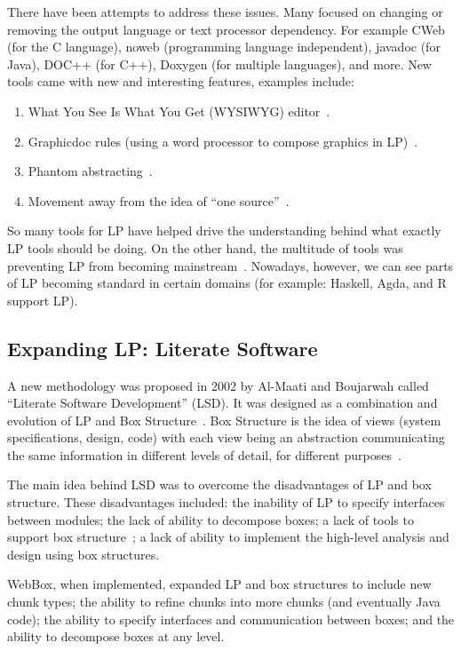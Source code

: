 \documentclass[preprint, 10pt]{sigplanconf}
\begin{document}
There have been attempts to address these issues. Many focused on changing or
removing the output language or text processor dependency. For example CWeb (for
the C language), noweb (programming language independent), javadoc (for Java),
DOC++ (for C++), Doxygen (for multiple languages), and more. New tools came with new and interesting features, examples include:

\begin{enumerate}
\item What You See Is What You Get (WYSIWYG)
editor~\cite{FritzsonGunnarssonAndJirstrand2002}.
\item Graphicdoc rules (using a word processor to compose graphics in
LP)~\cite{ShumAndCook1993}.
\item Phantom abstracting~\cite{ShumAndCook1993}.
\item Movement away from the idea of ``one source''~\cite{Simonis2003}.
\end{enumerate}

So many tools for LP have helped drive the understanding behind what exactly LP
tools should be doing. On the other hand, the multitude of tools was preventing
LP from becoming mainstream~\cite{Ramsey1994}. Nowadays, however, we can see
parts of LP becoming standard in certain domains (for example: Haskell, Agda,
and R support LP).

\subsection{Expanding LP: Literate Software}

A new methodology was proposed in 2002 by Al-Maati and Boujarwah called
``Literate Software Development'' (LSD). It was designed as a combination and
evolution of LP and Box Structure~\cite{Mills1986}. Box Structure
is the idea of views (system specifications, design, code) with each view being
an abstraction communicating the same information in different levels of detail,
for different purposes~\cite{AlMatiiAndBoujarwah2002}.

The main idea behind LSD was to overcome the disadvantages of LP and box
structure. These disadvantages included: the inability of LP to specify
interfaces between modules; the lack of ability to decompose boxes; a lack of
tools to support box structure~\cite{Deck1996}; a lack of ability to implement
the high-level analysis and design using box structures.

WebBox, when implemented, expanded LP and box structures to include new chunk
types; the ability to refine chunks into more chunks (and eventually Java code);
the ability to specify interfaces and communication between boxes; and the
ability to decompose boxes at any level.
\end{document}
